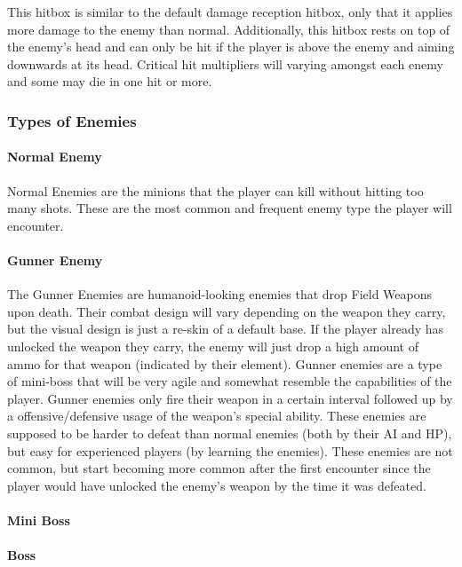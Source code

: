 \documentclass[12pt]{article}
\begin{document}
This hitbox is similar to the default damage reception hitbox, only that it applies more damage to the enemy than normal. Additionally, this hitbox rests on top of the enemy's head and can only be hit if the player is above the enemy and aiming downwards at its head. Critical hit multipliers will varying amongst each enemy and some may die in one hit or more. 

\subsubsection{Types of Enemies}

\paragraph{Normal Enemy}

Normal Enemies are the minions that the player can kill without hitting too many shots. These are the most common and frequent enemy type the player will encounter. 

\paragraph{Gunner Enemy}

The Gunner Enemies are humanoid-looking enemies that drop Field Weapons upon death. Their combat design will vary depending on the weapon they carry, but the visual design is just a re-skin of a default base. If the player already has unlocked the weapon they carry, the enemy will just drop a high amount of ammo for that weapon (indicated by their element). Gunner enemies are a type of mini-boss that will be very agile and somewhat resemble the capabilities of the player. Gunner enemies only fire their weapon in a certain interval followed up by a offensive/defensive usage of the weapon's special ability. These enemies are supposed to be harder to defeat than normal enemies (both by their AI and HP), but easy for experienced players (by learning the enemies). These enemies are not common, but start becoming more common after the first encounter since the player would have unlocked the enemy's weapon by the time it was defeated. 

\paragraph{Mini Boss}

\paragraph{Boss}
\end{document}

